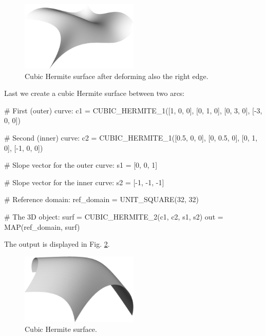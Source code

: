 \begin{figure}[!ht]
\begin{center}
\includegraphics[width=0.5\textwidth]{img/curves-14d.png}
\end{center}
\vspace{-6mm}
\caption{Cubic Hermite surface after deforming also the right edge.}
\label{fig:curves-14d}
\end{figure}
\noindent
\noindent
Last we create a cubic Hermite surface between two arcs:

\begin{bluecode}
# First (outer) curve:
c1 = CUBIC_HERMITE_1([1, 0, 0], [0, 1, 0], [0, 3, 0], [-3, 0, 0])

# Second (inner) curve:
c2 = CUBIC_HERMITE_1([0.5, 0, 0], [0, 0.5, 0], [0, 1, 0], [-1, 0, 0])

# Slope vector for the outer curve:
s1 = [0, 0, 1]

# Slope vector for the inner curve:
s2 = [-1, -1, -1]

# Reference domain:
ref_domain = UNIT_SQUARE(32, 32)

# The 3D object:
surf = CUBIC_HERMITE_2(c1, c2, s1, s2)
out = MAP(ref_domain, surf)
\end{bluecode}
The output is displayed in Fig. \ref{fig:curves-14}.\\

\begin{figure}[!ht]
\begin{center}
\includegraphics[width=0.5\textwidth]{img/curves-14.png}
\end{center}
\vspace{-4mm}
\caption{Cubic Hermite surface.}
\label{fig:curves-14}
\end{figure}
\noindent



